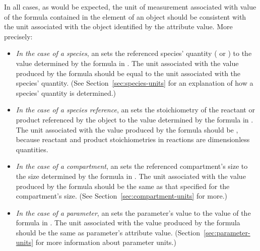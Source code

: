 In all cases, as would be expected, the unit of measurement
associated with value of the formula contained in the 
element of an \EventAssignment object should be consistent with
the unit associated with the object identified by the
 attribute value.  More precisely:
\begin{itemize}
  
\item \emph{In the case of a species}, an \EventAssignment sets
  the referenced species' quantity ( or
  ) to the value determined by the formula in
  .  The unit associated with the value produced by
  the  formula should be equal to the unit associated
  with the species' quantity.  (See
  Section~\ref{sec:species-units} for an explanation of how a
  species' quantity is determined.)

\item \emph{In the case of a species reference}, an
  \EventAssignment sets the stoichiometry of the reactant or
  product referenced by the \SpeciesReference object to the value
  determined by the formula in .  The unit associated
  with the value produced by the  formula should be
  , because reactant and product
  stoichiometries in reactions are dimensionless quantities.

\item \emph{In the case of a compartment}, an \EventAssignment
  sets the referenced compartment's size to the size determined by
  the formula in .  The unit associated with the value
  produced by the  formula should be the same as that
  specified for the compartment's size.  (See
  Section~\ref{sec:compartment-units} for more.)

\item \emph{In the case of a parameter}, an \EventAssignment sets
  the parameter's value to the value of the formula in
  .  The unit associated with the value produced by
  the  formula should be the same as parameter's
   attribute value.
  (Section~\ref{sec:parameter-units} for more information about
  parameter units.)


\end{itemize}

